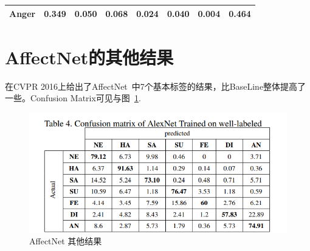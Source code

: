 \documentclass[11pt, a4paper]{article}
\begin{document}
\begin{CJK}{UTF8}{gbsn}
\begin{table}[htbp]
\begin{center}
\begin{tabular}{ | l | l | l | l | l |l | l |l |  }
			Anger       &  0.349  &  0.050  &  0.068  &  0.024  &  0.040  &  0.004  &  \textbf{0.464} \\ \hline

		\end{tabular}
		\label{tab:alexnet_cm}
	\end{center}
\end{table}	

\section{AffectNet的其他结果}

在CVPR 2016上给出了AffectNet~\cite{ref:affcvpr}中7个基本标签的结果，比BaseLine整体提高了一些。Confusion Matrix可见与图~\ref{fig:affcm}.

\begin{figure}[htbp]
	\centering %
	\includegraphics[width=15cm]{affcm}
	\caption{AffectNet 其他结果}
	\label{fig:affcm}
\end{figure}

\end{CJK}









  
 





\end{document}
